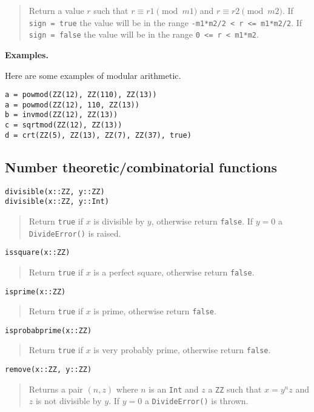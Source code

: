 \documentclass[a4paper,10pt]{article}
\newcommand{\code}{\lstinline}
\newcommand{\desc}[1]{\vspace{-3mm}\begin{quote}#1\end{quote}}
\begin{document}
{{{{{{\desc{Return a value $r$ such that $r \equiv r1 \pmod {m1}$ and $r \equiv r2 \pmod{m2}$.
If \code{sign = true} the value will be in the range \code{-m1*m2/2 < r <= m1*m2/2}. If
\code{sign = false} the value will be in the range \code{0 <= r < m1*m2}.}

\textbf{Examples.}

Here are some examples of modular arithmetic.

\begin{lstlisting}
a = powmod(ZZ(12), ZZ(110), ZZ(13))
a = powmod(ZZ(12), 110, ZZ(13))
b = invmod(ZZ(12), ZZ(13))
c = sqrtmod(ZZ(12), ZZ(13))
d = crt(ZZ(5), ZZ(13), ZZ(7), ZZ(37), true)
\end{lstlisting}

\subsection{Number theoretic/combinatorial functions}

\begin{lstlisting}
divisible(x::ZZ, y::ZZ)
divisible(x::ZZ, y::Int)
\end{lstlisting}

\desc{Return \code{true} if $x$ is divisible by $y$, otherwise return \code{false}. If
$y = 0$ a \code{DivideError()} is raised.}

\begin{lstlisting}
issquare(x::ZZ)
\end{lstlisting}

\desc{Return \code{true} if $x$ is a perfect square, otherwise return \code{false}.}

\begin{lstlisting}
isprime(x::ZZ)
\end{lstlisting}

\desc{Return \code{true} if $x$ is prime, otherwise return \code{false}.}

\begin{lstlisting}
isprobabprime(x::ZZ)
\end{lstlisting}

\desc{Return \code{true} if $x$ is very probably prime, otherwise return \code{false}.}

\begin{lstlisting}
remove(x::ZZ, y::ZZ)
\end{lstlisting}

\desc{Returns a pair $(n, z)$ where $n$ is an \code{Int} and $z$ a \code{ZZ} such that
$x = y^nz$ and $z$ is not divisible by $y$. If $y = 0$ a \code{DivideError()} is thrown.}

}}}}}}
\end{document}
